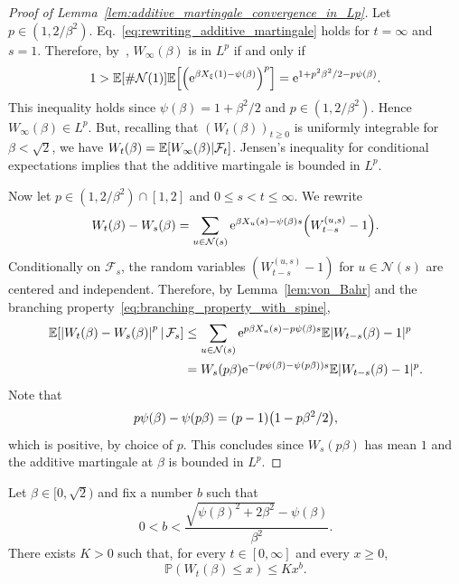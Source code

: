 \documentclass[AHL,Unicode,longabstracts,published]{cedram}
\newcommand{\e}{\mathrm{e}}
\newcommand{\E}{\mathbb{E}}
\renewcommand{\P}{\mathbb{P}}
\newcommand\1{\mathds{1}}
\newcommand{\cF}{\mathcal{F}}
\newcommand{\cN}{\mathcal{N}}
\let\originalleft\left
\let\originalright\right
\renewcommand{\left}{\mathopen{}\mathclose\bgroup\originalleft}
\renewcommand{\right}{\aftergroup\egroup\originalright}
\begin{document}
\begin{proof}[Proof of Lemma~\ref{lem:additive_martingale_convergence_in_Lp}]
Let $p \in (1, 2/\beta^2)$. Eq.~\eqref{eq:rewriting_additive_martingale} holds for $t = \infty$ and $s = 1$. Therefore, by~\cite[Proposition~4.11]{Liu2002}, $W_\infty(\beta)$ is in $L^p$ if and only if
\begin{equation*}
1 > \E \left[\# \cN(1) \right] \E \left[\left(\e^{\beta X_\xi(1) - \psi(\beta)} \right)^p \right] = \e^{1 + p^2 \beta^2/2 - p\psi(\beta)}.
\end{equation*}
This inequality holds since $\psi(\beta) = 1 + \beta^2/2$ and $p \in (1, 2/\beta^2)$. Hence ${W_\infty(\beta) \in L^p}$. But, recalling that $(W_t(\beta))_{t\geq 0}$ is uniformly integrable for $\beta < \sqrt{2}$, we have $W_t(\beta) = \E \left[W_\infty(\beta) \middle| \cF_t \right]$. Jensen's inequality for conditional expectations implies that the additive martingale is bounded in $L^p$.

Now let $p \in (1, 2/\beta^2) \cap [1, 2]$ and $0 \leq s < t \leq \infty$. We rewrite
\begin{equation*}
W_t(\beta) - W_s(\beta) = \sum_{u \in \cN(s)} \e^{\beta X_u(s) - \psi(\beta)s} \left(W_{t - s}^{(u, s)} - 1\right).
\end{equation*}
Conditionally on $\cF_s$, the random variables $(W_{t - s}^{(u, s)} - 1)$ for $u \in \cN(s)$ are centered and independent. Therefore, by Lemma~\ref{lem:von_Bahr} and the branching property~\eqref{eq:branching_property_with_spine},
\begin{equation}
\begin{aligned}[t]
\E \left[\left|W_t(\beta) - W_s(\beta)\right|^p \,\middle|\, \cF_s \right]  
&\leq \sum_{u \in \cN(s)} \e^{p \beta X_u(s) - p \psi(\beta)s} \E|W_{t-s}(\beta) - 1|^p \\
&= W_s(p\beta) \e^{-(p\psi(\beta) - \psi(p\beta))s} \E|W_{t-s}(\beta) - 1|^p. 
\end{aligned}
\end{equation}
Note that
\begin{equation}\label{eq:pc-cp}
p\psi(\beta) - \psi(p\beta) = (p - 1)\left(1 - p\beta^2/2\right),
\end{equation}
which is positive, by choice of $p$. This concludes since $W_s(p\beta)$ has mean $1$ and the additive martingale at $\beta$ is bounded in $L^p$.
\end{proof}

\begin{lemm}\label{lem:left_tail_additive_martingale}
Let $\beta \in [0, \sqrt{2})$ and fix a number $b$ such that
\begin{equation}\label{eq:b_values}
0 < b < \frac{\sqrt{\psi(\beta)^2 + 2\beta^2} - \psi(\beta)}{\beta^2}.
\end{equation}
There exists $K > 0$ such that, for every $t \in [0, \infty]$ and every $x \geq 0$,
\begin{equation}\label{eq:left_tail_additive_martingale}
\P(W_t(\beta) \leq x) \leq K x^b.
\end{equation}
\end{lemm}
\end{document}
